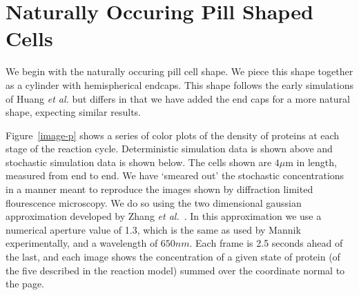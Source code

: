 \documentclass[letterpaper,twocolumn,amsmath,amssymb,pre]{revtex4-1}
\newcommand\micron{\ensuremath{\mu\text{m}}}
\begin{document}



\section{Naturally Occuring Pill Shaped Cells}

We begin with the naturally occuring pill cell shape.  We piece this
shape together as a cylinder with hemispherical endcaps.  This shape
follows the early simulations of Huang \emph{et al.} but differs in
that we have added the end caps for a more natural shape, expecting
similar results.

Figure~\ref{image-p} shows a series of color plots of the density of
proteins at each stage of the reaction cycle. Deterministic simulation
data is shown above and stochastic simulation data is shown below.
The cells shown are $4\micron$ in length, measured from end to end.
We have `smeared out' the stochastic concentrations in a manner meant
to reproduce the images shown by diffraction limited flourescence
microscopy.  We do so using the two dimensional gaussian approximation
developed by Zhang \emph{et al.}~\cite{zhang2007gaussian}.  In this
approximation we use a numerical aperture value of 1.3, which is the
same as used by Mannik experimentally, and a wavelength of $650nm$.
Each frame is 2.5 seconds ahead of the last, and each image shows the
concentration of a given state of protein (of the five described in
the reaction model) summed over the coordinate normal to the page.
\end{document}
